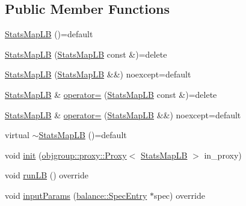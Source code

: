 \subsection*{Public Member Functions}
\begin{DoxyCompactItemize}
\item 
\hyperlink{structvt_1_1vrt_1_1collection_1_1lb_1_1_stats_map_l_b_ae854ea50c2de3fadee41292343301b6d}{Stats\+Map\+LB} ()=default
\item 
\hyperlink{structvt_1_1vrt_1_1collection_1_1lb_1_1_stats_map_l_b_aff22302292a842b662d35393182340a8}{Stats\+Map\+LB} (\hyperlink{structvt_1_1vrt_1_1collection_1_1lb_1_1_stats_map_l_b}{Stats\+Map\+LB} const \&)=delete
\item 
\hyperlink{structvt_1_1vrt_1_1collection_1_1lb_1_1_stats_map_l_b_a999927155e651a8f9906096df0558a71}{Stats\+Map\+LB} (\hyperlink{structvt_1_1vrt_1_1collection_1_1lb_1_1_stats_map_l_b}{Stats\+Map\+LB} \&\&) noexcept=default
\item 
\hyperlink{structvt_1_1vrt_1_1collection_1_1lb_1_1_stats_map_l_b}{Stats\+Map\+LB} \& \hyperlink{structvt_1_1vrt_1_1collection_1_1lb_1_1_stats_map_l_b_a8cf644da07b97637eb00c5384a59ee1e}{operator=} (\hyperlink{structvt_1_1vrt_1_1collection_1_1lb_1_1_stats_map_l_b}{Stats\+Map\+LB} const \&)=delete
\item 
\hyperlink{structvt_1_1vrt_1_1collection_1_1lb_1_1_stats_map_l_b}{Stats\+Map\+LB} \& \hyperlink{structvt_1_1vrt_1_1collection_1_1lb_1_1_stats_map_l_b_aee5bfc8e45ac47056b8b22128bc0f86e}{operator=} (\hyperlink{structvt_1_1vrt_1_1collection_1_1lb_1_1_stats_map_l_b}{Stats\+Map\+LB} \&\&) noexcept=default
\item 
virtual \hyperlink{structvt_1_1vrt_1_1collection_1_1lb_1_1_stats_map_l_b_afd879aa0258b984785b70249c7f06846}{$\sim$\+Stats\+Map\+LB} ()=default
\item 
void \hyperlink{structvt_1_1vrt_1_1collection_1_1lb_1_1_stats_map_l_b_a5af7ebfa026d3b236fee88bc2b5d139e}{init} (\hyperlink{structvt_1_1objgroup_1_1proxy_1_1_proxy}{objgroup\+::proxy\+::\+Proxy}$<$ \hyperlink{structvt_1_1vrt_1_1collection_1_1lb_1_1_stats_map_l_b}{Stats\+Map\+LB} $>$ in\+\_\+proxy)
\item 
void \hyperlink{structvt_1_1vrt_1_1collection_1_1lb_1_1_stats_map_l_b_a20a7bd354dcaca4393c66034be3b4083}{run\+LB} () override
\item 
void \hyperlink{structvt_1_1vrt_1_1collection_1_1lb_1_1_stats_map_l_b_a495d91782f11c1bb5d1774a05b2a73f6}{input\+Params} (\hyperlink{structvt_1_1vrt_1_1collection_1_1balance_1_1_spec_entry}{balance\+::\+Spec\+Entry} $\ast$spec) override
\end{DoxyCompactItemize}
